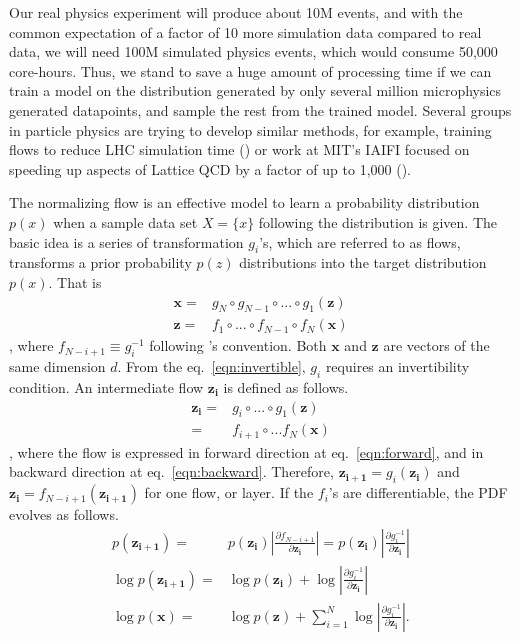 Our real physics experiment will produce about 10M events, and with the common expectation of a factor of 10 more simulation data compared to real data, we will need 100M simulated physics events, which would consume 50,000 core-hours. Thus, we stand to save a huge amount of processing time if we can train a model on the distribution generated by only several million microphysics generated datapoints, and sample the rest from the trained model. Several groups in particle physics are trying to develop similar methods, for example, training flows to reduce LHC simulation time (\citet{stan}) or work at MIT's IAIFI focused on speeding up aspects of Lattice QCD by a factor of up to 1,000 (\citet{phialia}). 


The normalizing flow is an effective model to learn a probability distribution $p(x)$ when a sample data set $X=\{x\}$ following the distribution is given. The basic idea is a series of transformation $g_i$'s, which are referred to as flows, transforms a prior probability $p(z)$ distributions into the target distribution $p(x)$. That is
\begin{align}
    \mathbf{x} =& g_N \circ g_{N-1}\circ ... \circ g_1 (\mathbf{z}) \\
    \mathbf{z} =& f_1 \circ ... \circ f_{N-1} \circ f_N (\mathbf{x}) \label{eqn:invertible}
\end{align}
, where $f_{N-i+1}\equiv g_i^{-1}$ following \citet{9089305}'s convention. Both $\mathbf{x}$ and $\mathbf{z}$ are vectors of the same dimension $d$. From the eq.~\ref{eqn:invertible}, $g_i$ requires an invertibility condition. An intermediate flow $\mathbf{z_i}$ is defined as follows.
\begin{align}
\mathbf{z_i} =&g_i \circ ... \circ g_1(\mathbf{z}) \label{eqn:forward}\\
    =&f_{i+1}\circ ...f_N(\mathbf{x}) \label{eqn:backward}
\end{align}
, where the flow is expressed in forward direction at eq.~\ref{eqn:forward}, and in backward direction at eq.~\ref{eqn:backward}. Therefore, $\mathbf{z_{i+1}}=g_i (\mathbf{z_i})$ and $\mathbf{z_i} = f_{N-i+1}(\mathbf{z_{i+1}})$ for one flow, or layer. If the $f_i$'s are differentiable, the PDF evolves as follows.
\begin{align}
 p(\mathbf{z_{i+1}})=& p(\mathbf{z_i})|\frac{\partial f_{N-i+1}}{\partial \mathbf{z_i}}| =p(\mathbf{z_i})|\frac{\partial g_{i}^{-1}}{\partial \mathbf{z_i}}|\\
 \log p(\mathbf{z_{i+1}}) =& \log p(\mathbf{z_i}) + \log|\frac{\partial g_i^{-1}}{\partial \mathbf{z_i}}| \label{eqn:logprob}\\
 \log p(\mathbf{x}) =& \log p(\mathbf{z}) + \sum\limits_{i=1}^N \log|\frac{\partial g_i^{-1}}{\partial \mathbf{z_i}}|.
\end{align}
